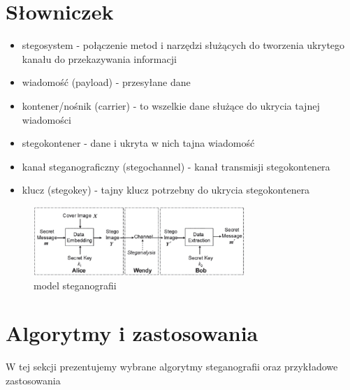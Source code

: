 \documentclass{article}
\begin{document}
\section{Słowniczek}
\begin{itemize}
	\item stegosystem - połączenie metod i narzędzi służących do tworzenia ukrytego kanału do przekazywania informacji
	\item wiadomość (payload) - przesyłane dane
	\item kontener/nośnik (carrier) - to wszelkie dane służące do ukrycia tajnej wiadomości
	\item stegokontener - dane i ukryta w nich tajna wiadomość
	\item kanał steganograficzny (stegochannel) - kanał transmisji stegokontenera
	\item klucz (stegokey) - tajny klucz potrzebny do ukrycia stegokontenera
\end{itemize}
\begin{figure}
	\centering
	\includegraphics[width=8cm]{model_steganografii}
	\caption{model steganografii}
\end{figure}
\section{Algorytmy i zastosowania}
W tej sekcji prezentujemy wybrane algorytmy steganografii oraz przykładowe zastosowania
\end{document}
